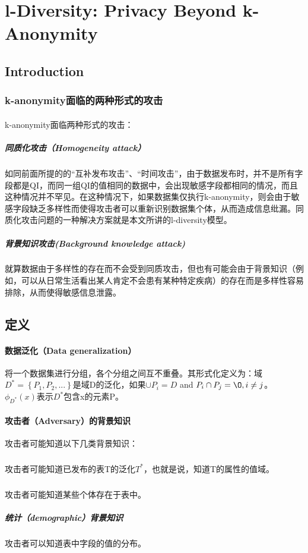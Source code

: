 \documentclass[12pt,a4paper]{article}
\begin{document}
\section{l-Diversity: Privacy Beyond k-Anonymity\cite{l-diversity} }

\subsection{Introduction}
\subsubsection{k-anonymity面临的两种形式的攻击}
\paragraph{} k-anonymity面临两种形式的攻击：
	\subparagraph{同质化攻击（Homogeneity attack）} 如同前面所提的的“互补发布攻击”、“时间攻击”，由于数据发布时，并不是所有字段都是QI，而同一组QI的值相同的数据中，会出现敏感字段都相同的情况，而且这种情况并不罕见。在这种情况下，如果数据集仅执行k-anonymity，则会由于敏感字段缺乏多样性而使得攻击者可以重新识别数据集个体，从而造成信息纰漏。同质化攻击问题的一种解决方案就是本文所讲的l-diversity模型。
	\subparagraph{背景知识攻击(Background knowledge attack)} 就算数据由于多样性的存在而不会受到同质攻击，但也有可能会由于背景知识（例如，可以从日常生活看出某人肯定不会患有某种特定疾病）的存在而是多样性容易排除，从而使得敏感信息泄露。
	
\subsection{定义}
\paragraph{数据泛化（Data generalization）} 将一个数据集进行分组，各个分组之间互不重叠。其形式化定义为：域$D^*=\left \{P_1,P_2,...\right \}$是域D的泛化，如果$\cup P_i = D$ and $P_i \cap P_j = \O, i \neq j $。$\phi_{D^*}(x)$表示$D^*$包含x的元素P。

\paragraph{攻击者（Adversary）的背景知识} 攻击者可能知道以下几类背景知识：
	\subparagraph{} 攻击者可能知道已发布的表T的泛化$T^*$，也就是说，知道T的属性的值域。
	\subparagraph{} 攻击者可能知道某些个体存在于表中。
	\subparagraph{统计（demographic）背景知识} 攻击者可以知道表中字段的值的分布。
\end{document}
